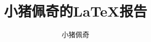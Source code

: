 \documentclass[13.75pt,a4paper]{article}
\title{小猪佩奇的\LaTeX 报告}
\author{小猪佩奇}
\newcommand{\clearpagestyle}[0]{\thispagestyle{empty}}
\begin{document}
\begin{titlepage}
    \maketitle\clearpagestyle
    \newpage{}\tableofcontents
    \newpage{}
\end{titlepage}




\end{document}
